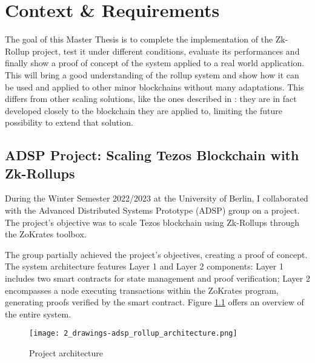 \chapter{Context \& Requirements\label{cha:chapter4}}
The goal of this Master Thesis is to complete the implementation of the Zk-Rollup project, test it under different conditions, evaluate its performances and finally show a proof of concept of the system applied to a real world application. This will bring a good understanding of the rollup system and show how it can be used and applied to other minor blockchains without many adaptations. This differs from other scaling solutions, like the ones described in \cite{yang_review_2020}: they are in fact developed closely to the blockchain they are applied to, limiting the future possibility to extend that solution.

\section{ADSP Project: Scaling Tezos Blockchain with Zk-Rollups \label{sec:2_adspProject}}

During the Winter Semester 2022/2023 at the University of Berlin, I collaborated with the Advanced Distributed Systems Prototype (ADSP) group on a project. The project's objective was to scale Tezos blockchain using Zk-Rollups through the ZoKrates toolbox.

The group partially achieved the project's objectives, creating a proof of concept. The system architecture features Layer 1 and Layer 2 components: Layer 1 includes two smart contracts for state management and proof verification; Layer 2 encompasses a node executing transactions within the ZoKrates program, generating proofs verified by the smart contract. Figure \ref{fig:3_general_rollup_architecture} offers an overview of the entire system.

\begin{figure}[ht]
  \centering
  \texttt{[image: 2\_drawings-adsp\_rollup\_architecture.png]}
  \caption[Project Architecture]{Project architecture}  
  \label{fig:3_general_rollup_architecture}
\end{figure}

